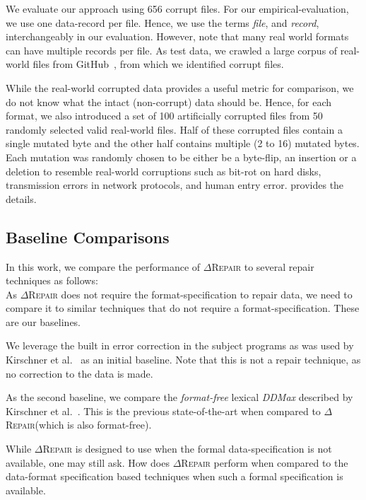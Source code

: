 \documentclass[acmsmall,screen,review,anonymous]{acmart}
\newcommand{\Formatfree}{Format-free\xspace}
\newcommand{\formatfree}{format-free\xspace}
\newcommand{\Formatdependent}{Format-dependent\xspace}
\newcommand{\approach}{\textsc{$\Delta$Repair}\xspace}
\newcommand{\ddmax}{\textit{DDMax}\xspace}
\newcommand{\drepair}{\approach}
\begin{document}
We evaluate our approach using 656 corrupt files.
For our empirical-evaluation, we use one data-record per file. Hence, we use
the terms \emph{file}, and \emph{record}, interchangeably in our evaluation.
However, note that many real world formats can have multiple records per file.
As test data, we crawled a large corpus of real-world files
from GitHub~\cite{githubapi}, from which we identified corrupt files. 

While the real-world corrupted data provides a useful metric for comparison,
we do not know what the intact (non-corrupt) data should be. Hence,
for each format, we also introduced a set of 100 artificially corrupted
files from 50 randomly selected valid real-world files.
Half of these corrupted files contain a single mutated byte and the other half
contains multiple (2 to 16) mutated bytes.
Each mutation was randomly chosen to be either be a byte-flip, an insertion or a
deletion to resemble real-world corruptions such as bit-rot on hard disks,
transmission errors in network protocols, and human entry error.
 provides the details.

\subsection{Baseline Comparisons}
In this work, we compare the performance of \drepair to several repair
techniques as follows:\\

\noindent{\textbf{\Formatfree}.}
As \drepair does not require the format-specification to repair data, we
need to compare it to similar techniques that do not require a
format-specification. These are our baselines.
\begin{description}[wide]
\item[\textbf{(1) Basic:}]
  We leverage the built in error correction in the subject programs as was 
  used by Kirschner et al.~\cite{kirschner2020debugging} as an initial
  baseline. Note that this is not a repair technique, as no correction to
  the data is made.

\item[\textbf{(2) Lexical \ddmax:}] As the second baseline, we compare the
  \emph{\formatfree} lexical \ddmax described by Kirschner et al.~\cite{kirschner2020debugging}.
    This is the previous state-of-the-art when compared to \drepair (which is
    also \formatfree).
\end{description}


\noindent{\textbf{\Formatdependent}.}
While \drepair is designed to use when the formal data-specification is not
available, one may still ask. How does \drepair perform when compared to the
data-format specification based techniques when such a formal specification
is available.
\end{document}
